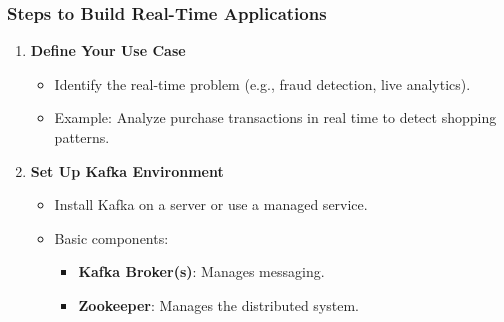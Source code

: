 \documentclass[aspectratio=169]{beamer}
\begin{document}
\begin{frame}[fragile]
    \frametitle{Steps to Build Real-Time Applications}
    \begin{enumerate}
        \item \textbf{Define Your Use Case}
            \begin{itemize}
                \item Identify the real-time problem (e.g., fraud detection, live analytics).
                \item Example: Analyze purchase transactions in real time to detect shopping patterns.
            \end{itemize}
        
        \item \textbf{Set Up Kafka Environment}
            \begin{itemize}
                \item Install Kafka on a server or use a managed service.
                \item Basic components:
                    \begin{itemize}
                        \item \textbf{Kafka Broker(s)}: Manages messaging.
                        \item \textbf{Zookeeper}: Manages the distributed system.
                    \end{itemize}
            \end{itemize}
    \end{enumerate}
\end{frame}
\end{document}
